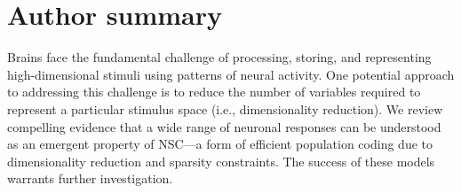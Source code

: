 \documentclass[10pt,letterpaper]{article}
\newcommand{\revise}[1]{\textcolor{blue}{#1}}
\begin{document}
\section*{Author summary}
Brains face the fundamental challenge of processing, storing, and representing high-dimensional stimuli using patterns of neural activity. One potential approach to addressing this challenge is to reduce the number of variables required to represent a particular stimulus space (i.e., dimensionality reduction).
We review compelling evidence that a wide range of neuronal responses can be understood as an emergent property of \acf{NSC}---a form of efficient population coding due to dimensionality reduction and sparsity constraints.
The success of these models warrants further investigation.


\linenumbers










\nolinenumbers


\appendix


\end{document}
